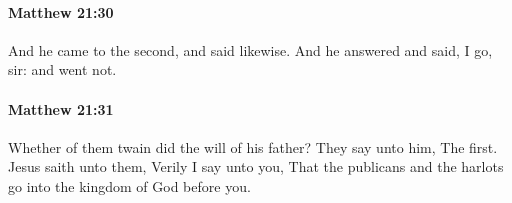 		\paragraph{Matthew 21:30} %
			\label{MATTHEW-21-30}

			And he came to the second, and said likewise. And he answered and said, I go, sir: and went not.

			\begin{framed}
			\scriptsize
				\begin{compactdesc}
					\item[SBLG] 
				\end{compactdesc}
			\end{framed}

		\paragraph{Matthew 21:31} %
			\label{MATTHEW-21-31}

			Whether of them twain did the will of his father? They say unto him, The first. Jesus saith unto them, Verily I say unto you, That the publicans and the harlots go into the kingdom of God before you.

